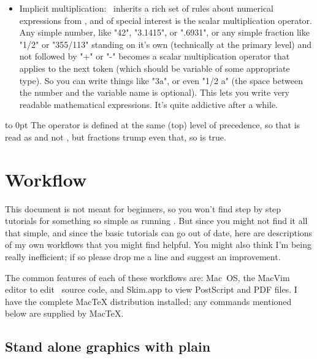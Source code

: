 \documentclass[a4paper,landscape]{article}
\begin{document}
\begin{itemize}
    \item Implicit multiplication: \MP\ inherits a rich set of rules about numerical
        expressions from \MF, and of special interest is the scalar multiplication
        operator.  Any simple number, like "42", "3.1415", or ".6931", or any simple
        fraction like "1/2" or "355/113" standing on it’s own (technically at the
        primary level) and not followed by "+" or "-" becomes a scalar
        multiplication operator that applies to the next token (which should be variable
        of some appropriate type).
        So you can write things like "3a", or even "1/2 a"
        (the space between the number and the variable name is optional). This
        lets you write very readable mathematical expressions. It’s quite
        addictive after a while.

\end{itemize}

\vskip -22pt
\vbox to 0pt{\vss\hsize 4in\noindent
The  operator is defined at the same (top) level of precedence, so
that  is read as  and not , but fractions
trump even that, so  is true.}

\newpage
\section{Workflow}

This document is not meant for beginners, so you won't find step by step tutorials
for something so simple as running \MP.  But since you might not find it all that
simple, and since the basic tutorials can go out of date, here are descriptions of
my own workflows that you might find helpful.  You might also think I'm being really
inefficient; if so please drop me a line and suggest an improvement.

The common features of each of these workflows are: Mac~OS, the MacVim editor to
edit \MP\ source code, and
Skim.app to view PostScript and PDF files.  I have the complete MacTeX distribution
installed; any commands mentioned below are supplied by MacTeX.

\subsection{Stand alone graphics with plain \MP}\label{sec:plain-flow}
\end{document}
